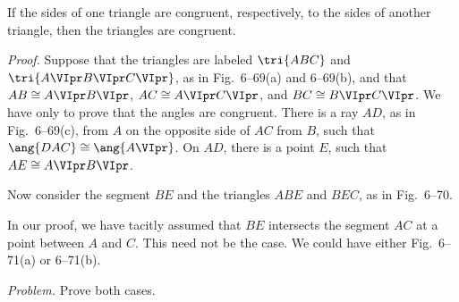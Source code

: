 \documentclass[11pt]{book}
\theoremstyle{bkplain}
\theoremstyle{XIplainnote}
\theoremstyle{bkplain}
\theoremstyle{bkplain}
\begin{document}
\begin{theorem}
If the sides of one triangle are congruent, respectively, to the sides of
another triangle, then the triangles are congruent.
\end{theorem}

\FIGVISIXTYNINE

\emph{Proof.} Suppose that the triangles are labeled $\tri{ABC}$ and
$\tri{A\VIpr B\VIpr C\VIpr}$, as in Fig.~6--69(a) and 6--69(b), and that $AB
\cong A\VIpr B\VIpr$, $AC \cong A\VIpr C\VIpr$, and $BC \cong B\VIpr C\VIpr$.
We have only to prove that the angles are congruent. There is a ray $AD$, as in
Fig.~6--69(c), from $A$ on the opposite side of $AC$ from $B$, such that
$\ang{DAC} \cong \ang{A\VIpr}$. On $AD$, there is a point $E$, such that $AE
\cong A\VIpr B\VIpr$.

\begin{steps}
\end{steps}

Now consider the segment $BE$ and the triangles $ABE$ and $BEC$, as in
Fig.~6--70.

\FIGVISEVENTY

\begin{steps}
\end{steps}

\begin{remark}
In our proof, we have tacitly assumed that $BE$ intersects the segment $AC$ at
a point between $A$ and $C$. This need not be the case. We could have either
Fig.~6--71(a) or 6--71(b).

\par\medskip\noindent\emph{Problem.} Prove both cases.
\end{remark}

\FIGVISEVENTYONE
\end{document}
